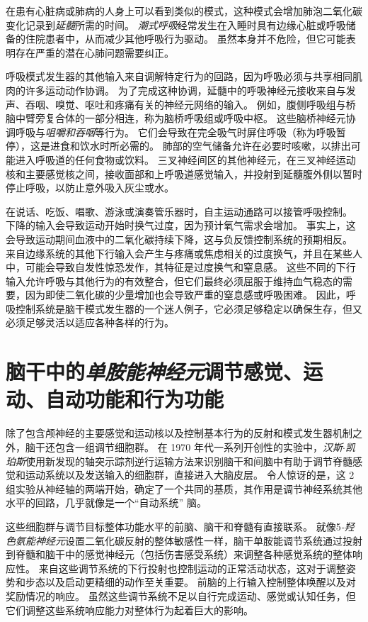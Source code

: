 在患有心脏病或肺病的人身上可以看到类似的模式，这种模式会增加肺泡二氧化碳变化记录到\textit{延髓}所需的时间。
\textit{潮式呼吸}经常发生在入睡时具有边缘心脏或呼吸储备的住院患者中，从而减少其他呼吸行为驱动。
虽然本身并不危险，但它可能表明存在严重的潜在心肺问题需要纠正。


呼吸模式发生器的其他输入来自调解特定行为的回路，因为呼吸必须与共享相同肌肉的许多运动动作协调。
为了完成这种协调，延髓中的呼吸神经元接收来自与发声、吞咽、嗅觉、呕吐和疼痛有关的神经元网络的输入。
例如，腹侧呼吸组与桥脑中臂旁复合体的一部分相连，称为脑桥呼吸组或呼吸中枢。
这些脑桥神经元协调呼吸与\textit{咀嚼和吞咽}等行为。
它们会导致在完全吸气时屏住呼吸（称为呼吸暂停），这是进食和饮水时所必需的。
肺部的空气储备允许在必要时咳嗽，以排出可能进入呼吸道的任何食物或饮料。
三叉神经间区的其他神经元，在三叉神经运动核和主要感觉核之间，接收面部和上呼吸道感觉输入，并投射到延髓腹外侧以暂时停止呼吸，以防止意外吸入灰尘或水。


在说话、吃饭、唱歌、游泳或演奏管乐器时，自主运动通路可以接管呼吸控制。
下降的输入会导致运动开始时换气过度，因为预计氧气需求会增加。
事实上，这会导致运动期间血液中的二氧化碳持续下降，这与负反馈控制系统的预期相反。
来自边缘系统的其他下行输入会产生与疼痛或焦虑相关的过度换气，并且在某些人中，可能会导致自发性惊恐发作，其特征是过度换气和窒息感。
这些不同的下行输入允许呼吸与其他行为的有效整合，但它们最终必须屈服于维持血气稳态的需要，因为即使二氧化碳的少量增加也会导致严重的窒息感或呼吸困难。
因此，呼吸控制系统是脑干模式发生器的一个迷人例子，它必须足够稳定以确保生存，但又必须足够灵活以适应各种各样的行为。



\section{脑干中的\textit{单胺能神经元}调节感觉、运动、自动功能和行为功能}

除了包含颅神经的主要感觉和运动核以及控制基本行为的反射和模式发生器机制之外，脑干还包含一组调节细胞群。
在 1970 年代一系列开创性的实验中，\textit{汉斯$\cdot$凯珀斯}使用新发现的轴突示踪剂逆行运输方法来识别脑干和间脑中有助于调节脊髓感觉和运动系统以及发送输入的细胞群，直接进入大脑皮层。
令人惊讶的是，这 2 组实验从神经轴的两端开始，确定了一个共同的基质，其作用是调节神经系统其他水平的回路，几乎就像是一个“自动系统” 脑。


这些细胞群与调节目标整体功能水平的前脑、脑干和脊髓有直接联系。
就像5\textit{-羟色氨能神经元}设置二氧化碳反射的整体敏感性一样，脑干单胺能调节系统通过投射到脊髓和脑干中的感觉神经元（包括伤害感受系统）来调整各种感觉系统的整体响应性。
来自这些调节系统的下行投射也控制运动的正常活动状态，这对于调整姿势和步态以及启动更精细的动作至关重要。
前脑的上行输入控制整体唤醒以及对奖励情况的响应。
虽然这些调节系统不足以自行完成运动、感觉或认知任务，但它们调整这些系统响应能力对整体行为起着巨大的影响。



